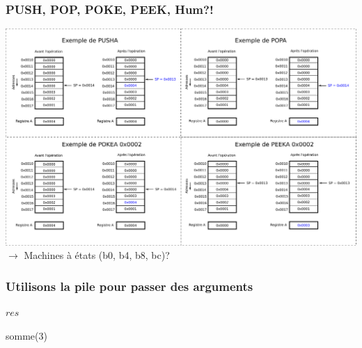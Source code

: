 \documentclass{beamer}
\begin{document}
\begin{frame}
\frametitle{PUSH, POP, POKE, PEEK, Hum?!}

\centering\includegraphics[width=\linewidth]{Figs/stack.pdf}\\

$\rightarrow$ Machines à états (b0, b4, b8, bc)?
\end{frame}

\begin{frame}
\frametitle{Utilisons la pile pour passer des arguments}

\begin{algorithmic}[1]
\EndWhile
\State \Return $res$
\EndFunction

\State somme($3$)
\EndFunction
\end{algorithmic}

\end{frame}
\end{document}
